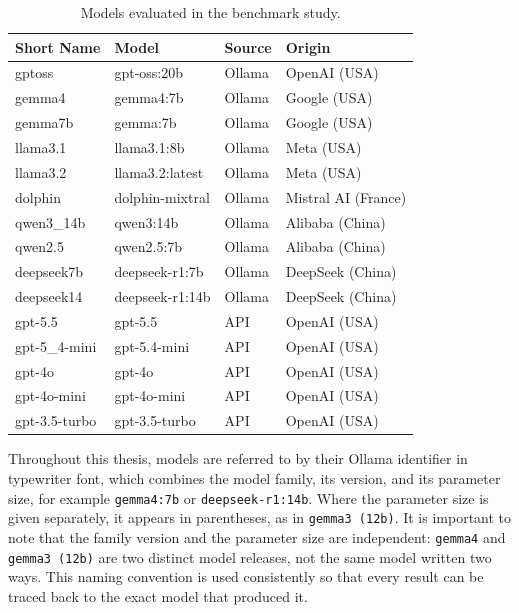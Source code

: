 \begin{table}[H]
    \centering
    \caption{Models evaluated in the benchmark study.}
    \label{tab:models}
    \begin{tabular}{llll}
        \hline
        \textbf{Short Name} & \textbf{Model} & \textbf{Source} & \textbf{Origin} \\
        \hline
        gptoss         & gpt-oss:20b          & Ollama  & OpenAI (USA) \\
        gemma4         & gemma4:7b             & Ollama  & Google (USA) \\
        gemma7b        & gemma:7b              & Ollama  & Google (USA) \\
        llama3.1       & llama3.1:8b           & Ollama  & Meta (USA) \\
        llama3.2       & llama3.2:latest       & Ollama  & Meta (USA) \\
        dolphin        & dolphin-mixtral       & Ollama  & Mistral AI (France) \\
        qwen3\_14b     & qwen3:14b             & Ollama  & Alibaba (China) \\
        qwen2.5        & qwen2.5:7b            & Ollama  & Alibaba (China) \\
        deepseek7b     & deepseek-r1:7b        & Ollama  & DeepSeek (China) \\
        deepseek14     & deepseek-r1:14b       & Ollama  & DeepSeek (China) \\
        gpt-5.5        & gpt-5.5               & API     & OpenAI (USA) \\
        gpt-5\_4-mini  & gpt-5.4-mini          & API     & OpenAI (USA) \\
        gpt-4o         & gpt-4o                & API     & OpenAI (USA) \\
        gpt-4o-mini    & gpt-4o-mini           & API     & OpenAI (USA) \\
        gpt-3.5-turbo  & gpt-3.5-turbo         & API     & OpenAI (USA) \\
        \hline
    \end{tabular}
\end{table}

Throughout this thesis, models are referred to by their Ollama identifier in
typewriter font, which combines the model family, its version, and its
parameter size, for example \texttt{gemma4:7b} or \texttt{deepseek-r1:14b}.
Where the parameter size is given separately, it appears in parentheses, as in
\texttt{gemma3 (12b)}.  It is important to note that the family version and the
parameter size are independent: \texttt{gemma4} and \texttt{gemma3 (12b)} are
two distinct model releases, not the same model written two ways.  This naming
convention is used consistently so that every result can be traced back to the
exact model that produced it.


